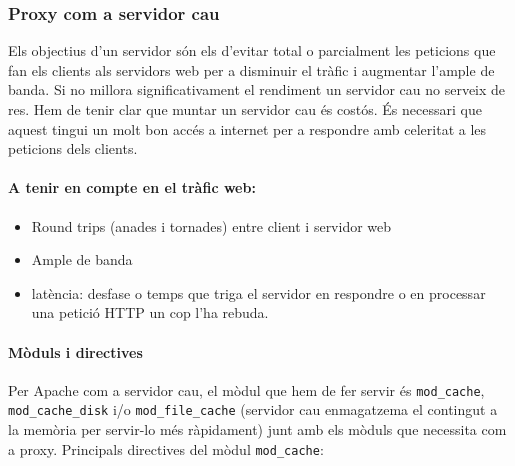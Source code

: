 \documentclass[a4paper, 11pt]{article}
\begin{document}
\subsubsection{Proxy com a servidor cau}
Els objectius d'un servidor són els d'evitar total o parcialment les peticions que fan els clients als servidors web per a disminuir el tràfic i augmentar l'ample de banda. Si no millora significativament el rendiment un servidor cau no serveix de res. Hem de tenir clar que muntar un servidor cau \'es costós. \'Es necessari que aquest tingui un molt bon acc\'es a internet per a respondre amb celeritat a les peticions dels clients. 

\paragraph{A tenir en compte en el tràfic web:}

\begin{itemize}
	\item Round trips (anades i tornades) entre client i servidor web
	\item Ample de banda
	\item latència: desfase o temps que triga el servidor en respondre o en processar una petició HTTP un cop l'ha rebuda.
\end{itemize}

\paragraph{Mòduls i directives \\}

Per Apache com a servidor cau, el mòdul que hem de fer servir \'es \verb+mod_cache+, \verb+mod_cache_disk+ i/o \verb+mod_file_cache+ (servidor cau enmagatzema el contingut a la memòria per servir-lo m\'es ràpidament) junt amb els mòduls que necessita com a proxy. Principals directives del mòdul \verb+mod_cache+:
\end{document}
